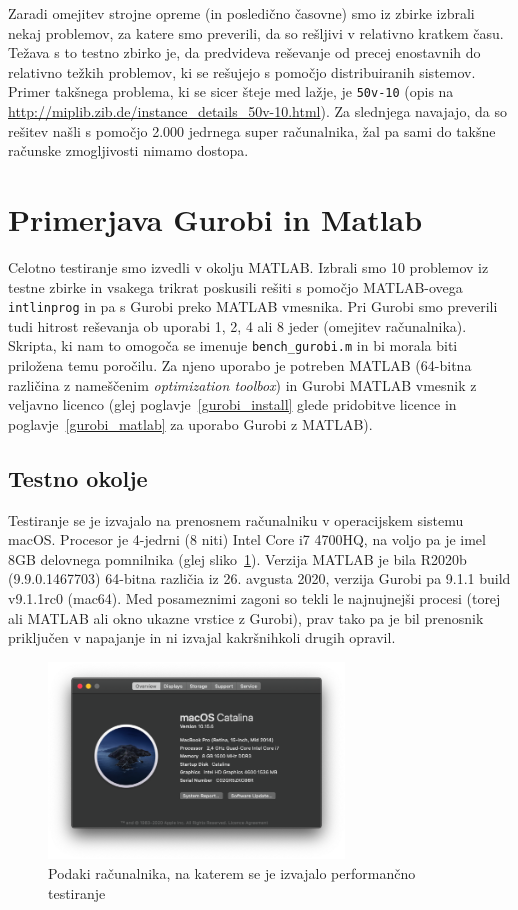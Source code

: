 \documentclass[a4paper,11pt]{article}
\begin{document}
Zaradi omejitev strojne opreme (in posledično časovne) smo iz zbirke izbrali nekaj problemov, za katere smo preverili, da so rešljivi v relativno kratkem času. Težava s to testno zbirko je, da predvideva reševanje od precej enostavnih do relativno težkih problemov, ki se rešujejo s pomočjo distribuiranih sistemov. Primer takšnega problema, ki se sicer šteje med lažje, je \texttt{50v-10} (opis na  \url{http://miplib.zib.de/instance_details_50v-10.html}). Za slednjega navajajo, da so rešitev našli s pomočjo 2.000 jedrnega super računalnika, žal pa sami do takšne računske zmogljivosti nimamo dostopa.

\section{Primerjava Gurobi in Matlab}
Celotno testiranje smo izvedli v okolju MATLAB. Izbrali smo 10 problemov iz testne zbirke in vsakega trikrat poskusili rešiti s pomočjo MATLAB-ovega \texttt{intlinprog} in pa s Gurobi preko MATLAB vmesnika. Pri Gurobi smo preverili tudi hitrost reševanja ob uporabi 1, 2, 4 ali 8 jeder (omejitev računalnika). Skripta, ki nam to omogoča se imenuje \texttt{bench\_gurobi.m} in bi morala biti priložena temu poročilu. Za njeno uporabo je potreben MATLAB (64-bitna različina z nameščenim \textit{optimization toolbox}) in Gurobi MATLAB vmesnik z veljavno licenco (glej poglavje~\ref{gurobi_install} glede pridobitve licence in poglavje~\ref{gurobi_matlab} za uporabo Gurobi z MATLAB).

\subsection{Testno okolje}
Testiranje se je izvajalo na prenosnem računalniku v operacijskem sistemu macOS. Procesor je 4-jedrni (8 niti) Intel Core i7 4700HQ, na voljo pa je imel 8GB delovnega pomnilnika (glej sliko~\ref{img:davids_mbp}). Verzija MATLAB je bila R2020b (9.9.0.1467703) 64-bitna različia iz 26. avgusta 2020, verzija Gurobi pa 9.1.1 build v9.1.1rc0 (mac64). Med posameznimi zagoni so tekli le najnujnejši procesi (torej ali MATLAB ali okno ukazne vrstice z Gurobi), prav tako pa je bil prenosnik priključen v napajanje in ni izvajal kakršnihkoli drugih opravil.

\begin{figure}[htpb]
	\centering
	\includegraphics[width=0.7\textwidth]{images/davids-mbp.png}
	\caption{Podaki računalnika, na katerem se je izvajalo performančno testiranje}
	\label{img:davids_mbp}
\end{figure}
\end{document}
